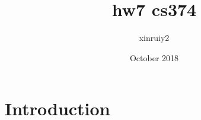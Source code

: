 \documentclass{article}
\title{hw7 cs374}
\author{xinruiy2 }
\date{October 2018}
\begin{document}
\maketitle

\section{Introduction}
\end{document}
